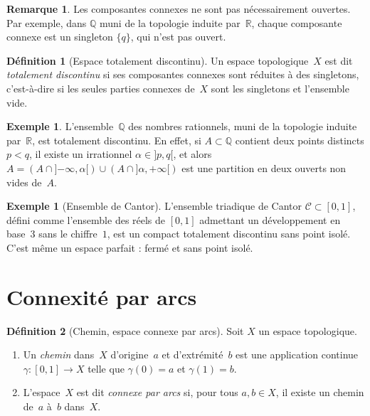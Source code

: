 \documentclass[12pt,a4paper,openany]{book}
\theoremstyle{definition}
\newtheorem{definition}{Définition}[chapter]
\theoremstyle{cours}
\theoremstyle{coursnormal}
\newtheorem{remarque}[theoreme]{Remarque}
\newtheorem{exemple}[theoreme]{Exemple}
\begin{document}
\begin{remarque}
\label{rem:composante-non-ouverte}
Les composantes connexes ne sont pas nécessairement ouvertes. Par exemple, dans
$\mathbb{Q}$ muni de la topologie induite par~$\mathbb{R}$, chaque composante
connexe est un singleton $\{q\}$, qui n'est pas ouvert.
\end{remarque}

\begin{definition}[Espace totalement discontinu]
\label{def:totalement-discontinu}
Un espace topologique~$X$ est dit \emph{totalement discontinu} si ses composantes
connexes sont réduites à des singletons, c'est-à-dire si les seules parties
connexes de~$X$ sont les singletons et l'ensemble vide.
\end{definition}

\begin{exemple}
\label{ex:Q-totalement-discontinu}
L'ensemble~$\mathbb{Q}$ des nombres rationnels, muni de la topologie induite
par~$\mathbb{R}$, est totalement discontinu. En effet, si $A \subset \mathbb{Q}$
contient deux points distincts $p < q$, il existe un irrationnel
$\alpha \in {]p,q[}$, et alors
$A = (A \cap {]{-\infty},\alpha[}) \cup (A \cap {]\alpha,{+\infty}[})$
est une partition en deux ouverts non vides de~$A$.
\end{exemple}

\begin{exemple}[Ensemble de Cantor]
\label{ex:cantor-totalement-discontinu}
L'ensemble triadique de Cantor $\mathcal{C} \subset [0,1]$, défini comme
l'ensemble des réels de $[0,1]$ admettant un développement en base~$3$ sans le
chiffre~$1$, est un compact totalement discontinu sans point isolé.
C'est même un espace parfait : fermé et sans point isolé.
\end{exemple}

\section{Connexité par arcs}
\label{sec:connexite-arcs}

\begin{definition}[Chemin, espace connexe par arcs]
\label{def:connexe-par-arcs}
Soit $X$ un espace topologique.
\begin{enumerate}[label=(\roman*)]
  \item Un \emph{chemin} dans~$X$ d'origine~$a$ et d'extrémité~$b$ est une
        application continue $\gamma \colon [0,1] \to X$ telle que
        $\gamma(0) = a$ et $\gamma(1) = b$.
  \item L'espace~$X$ est dit \emph{connexe par arcs} si, pour tous $a, b \in X$,
        il existe un chemin de~$a$ à~$b$ dans~$X$.
\end{enumerate}
\end{definition}
\end{document}
